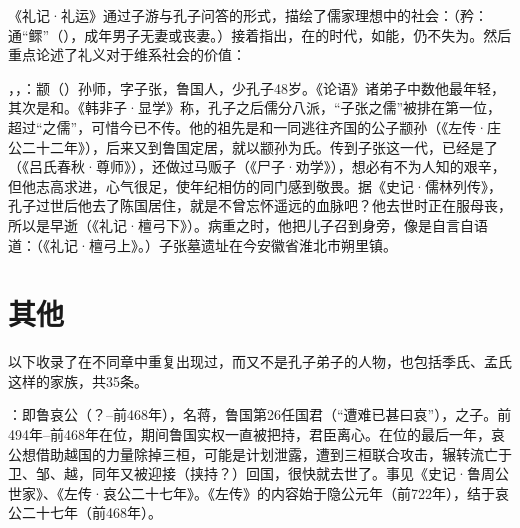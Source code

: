 《礼记·礼运》通过子游与孔子问答的形式，描绘了儒家理想中的社会：（矜：通“鳏”（），成年男子无妻或丧妻。）接着指出，在的时代，如能，仍不失为。然后重点论述了礼义对于维系社会的价值：

，，：颛（）孙师，字子张，鲁国人，少孔子48岁。《论语》诸弟子中数他最年轻，其次是和。《韩非子·显学》称，孔子之后儒分八派，“子张之儒”被排在第一位，超过“之儒”，可惜今已不传。他的祖先是和一同逃往齐国的公子颛孙（《左传·庄公二十二年》），后来又到鲁国定居，就以颛孙为氏。传到子张这一代，已经是了（《吕氏春秋·尊师》），还做过马贩子（《尸子·劝学》），想必有不为人知的艰辛，但他志高求进，心气很足，使年纪相仿的同门感到敬畏。据《史记·儒林列传》，孔子过世后他去了陈国居住，就是不曾忘怀遥远的血脉吧？他去世时正在服母丧，所以是早逝（《礼记·檀弓下》）。病重之时，他把儿子召到身旁，像是自言自语道：（《礼记·檀弓上》。）子张墓遗址在今安徽省淮北市朔里镇。


\lypdfbookmark\section*{其他}

以下收录了在不同章中重复出现过，而又不是孔子弟子的人物，也包括季氏、孟氏这样的家族，共35条。

\bigskip

：即鲁哀公（？--前468年），名蒋，鲁国第26任国君（“遭难已甚曰哀”），之子。前494年--前468年在位，期间鲁国实权一直被把持，君臣离心。在位的最后一年，哀公想借助越国的力量除掉三桓，可能是计划泄露，遭到三桓联合攻击，辗转流亡于卫、邹、越，同年又被迎接（挟持？）回国，很快就去世了。事见《史记·鲁周公世家》、《左传·哀公二十七年》。《左传》的内容始于隐公元年（前722年），结于哀公二十七年（前468年）。%

